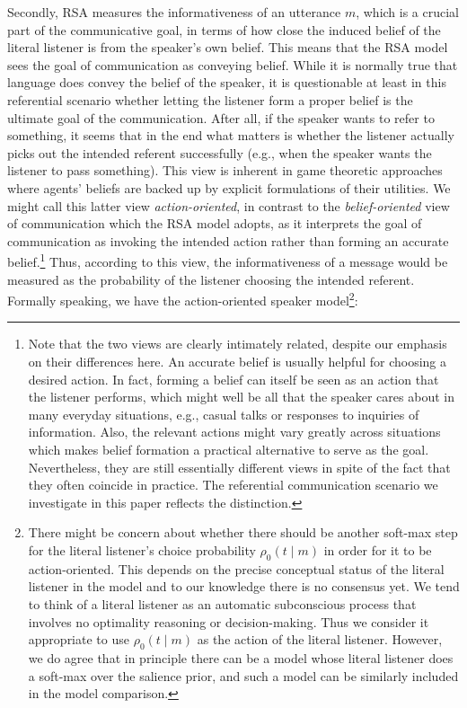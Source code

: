 Secondly, RSA measures the informativeness of an utterance $m$, which
is a crucial part of the communicative goal, in terms of how close the
induced belief of the literal listener is from the speaker's own
belief. This means that the RSA model sees the goal of communication
as conveying belief. While it is normally true that language does
convey the belief of the speaker, it is questionable at least in this
referential scenario whether letting the listener form a proper belief
is the ultimate goal of the communication. After all, if the speaker
wants to refer to something, it seems that in the end what matters is
whether the listener actually picks out the intended referent
successfully (e.g., when the speaker wants the listener to pass
something). This view is inherent in game theoretic approaches where
agents' beliefs are backed up by explicit formulations of their
utilities. We might call this latter view \emph{action-oriented}, in
contrast to the \emph{belief-oriented} view of communication which the
RSA model adopts, as it interprets the goal of communication as
invoking the intended action rather than forming an accurate
belief.\footnote{Note that the two views are clearly intimately
  related, despite our emphasis on their differences here. An accurate
  belief is usually helpful for choosing a desired action. In fact,
  forming a belief can itself be seen as an action that the listener
  performs, which might well be all that the speaker cares about in
  many everyday situations, e.g., casual talks or responses to
  inquiries of information. Also, the relevant actions might vary
  greatly across situations which makes belief formation a practical
  alternative to serve as the goal. Nevertheless, they are still
  essentially different views in spite of the fact that they often
  coincide in practice. The referential communication scenario we
  investigate in this paper reflects the distinction.} Thus, according
to this view, the informativeness of a message would be measured as
the probability of the listener choosing the intended
referent. Formally speaking, we have the action-oriented speaker model\footnote{There might be concern about whether there should be another soft-max step for the literal listener's choice probability $\rho_0(t\mid m)$ in order for it to be action-oriented. 
This depends on the precise conceptual status of the literal listener in the model and to our knowledge there is no consensus yet. We tend to think of a literal listener as an automatic subconscious process that involves no optimality reasoning or decision-making. Thus we consider it appropriate to use $\rho_0(t\mid m)$ as the action of the literal listener. However, we do agree that in principle there can be a model whose literal listener does a soft-max over the salience prior, and such a model can be similarly included in the model comparison.}:
  
